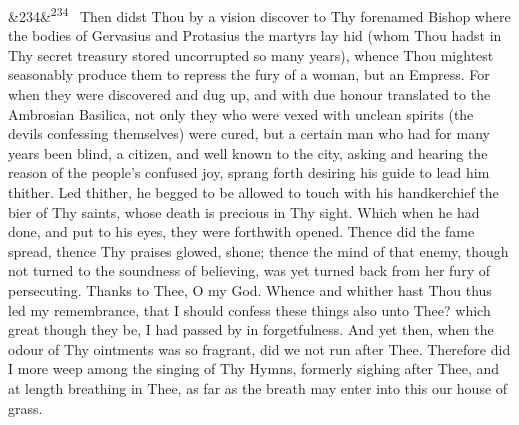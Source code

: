 \documentclass[12pt]{article}
\newcommand{\para}[1][]{\par\noindent\ifx&#1&\else\textsuperscript{\footnotesize #1}~\fi}
\begin{document}
\para[234] Then didst Thou by a vision discover to Thy forenamed Bishop where the bodies of Gervasius and Protasius the martyrs lay hid (whom Thou hadst in Thy secret treasury stored uncorrupted so many years), whence Thou mightest seasonably produce them to repress the fury of a woman, but an Empress. For when they were discovered and dug up, and with due honour translated to the Ambrosian Basilica, not only they who were vexed with unclean spirits (the devils confessing themselves) were cured, but a certain man who had for many years been blind, a citizen, and well known to the city, asking and hearing the reason of the people's confused joy, sprang forth desiring his guide to lead him thither. Led thither, he begged to be allowed to touch with his handkerchief the bier of Thy saints, whose death is precious in Thy sight. Which when he had done, and put to his eyes, they were forthwith opened. Thence did the fame spread, thence Thy praises glowed, shone; thence the mind of that enemy, though not turned to the soundness of believing, was yet turned back from her fury of persecuting. Thanks to Thee, O my God. Whence and whither hast Thou thus led my remembrance, that I should confess these things also unto Thee? which great though they be, I had passed by in forgetfulness. And yet then, when the odour of Thy ointments was so fragrant, did we not run after Thee. Therefore did I more weep among the singing of Thy Hymns, formerly sighing after Thee, and at length breathing in Thee, as far as the breath may enter into this our house of grass.
\end{document}
